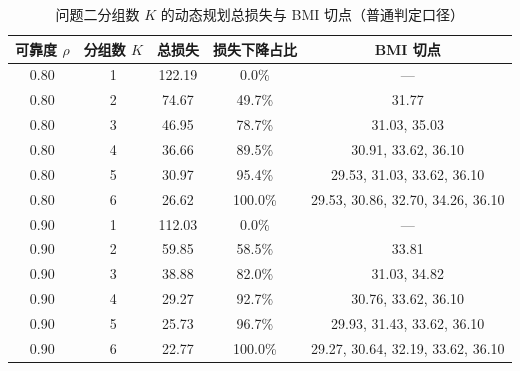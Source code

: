 \begin{table}[!htbp]
  \centering
  \caption{问题二分组数 $K$ 的动态规划总损失与 BMI 切点（普通判定口径）}
  \label{tab:a2}
  \small
  \begin{tabular}{@{}ccccc@{}}
    \toprule
    可靠度 $\rho$ & 分组数 $K$ & 总损失 & 损失下降占比 & BMI 切点 \\
    \midrule
    0.80 & 1 & 122.19 & 0.0\% & --- \\
    0.80 & 2 & 74.67 & 49.7\% & 31.77 \\
    0.80 & 3 & 46.95 & 78.7\% & 31.03, 35.03 \\
    0.80 & 4 & 36.66 & 89.5\% & 30.91, 33.62, 36.10 \\
    0.80 & 5 & 30.97 & 95.4\% & 29.53, 31.03, 33.62, 36.10 \\
    0.80 & 6 & 26.62 & 100.0\% & 29.53, 30.86, 32.70, 34.26, 36.10 \\
    0.90 & 1 & 112.03 & 0.0\% & --- \\
    0.90 & 2 & 59.85 & 58.5\% & 33.81 \\
    0.90 & 3 & 38.88 & 82.0\% & 31.03, 34.82 \\
    0.90 & 4 & 29.27 & 92.7\% & 30.76, 33.62, 36.10 \\
    0.90 & 5 & 25.73 & 96.7\% & 29.93, 31.43, 33.62, 36.10 \\
    0.90 & 6 & 22.77 & 100.0\% & 29.27, 30.64, 32.19, 33.62, 36.10 \\
    \bottomrule
  \end{tabular}
\end{table}
